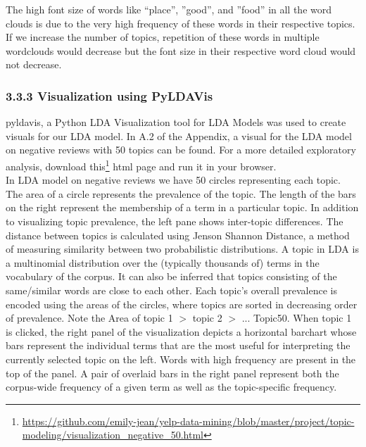 \documentclass{neu_handout}
\begin{document}
The high font size of words like “place”, ”good”, and ”food” in all the word clouds is due to the very high frequency of these words in their respective topics. If we increase the number of topics, repetition of these words in multiple wordclouds would decrease but the font size in their respective word cloud would not decrease. 

\subsubsection*{3.3.3 Visualization using PyLDAVis}
pyldavis, a Python LDA Visualization tool for LDA Models was used to create visuals for our LDA model. In A.2 of the Appendix, a visual for the LDA model on negative reviews with 50 topics can be found. For a more detailed exploratory analysis, download this\footnote{\url{https://github.com/emily-jean/yelp-data-mining/blob/master/project/topic-modeling/visualization_negative_50.html}} html page and run it in your browser.\\

In LDA model on negative reviews we have 50 circles representing each topic. The area of a circle represents the prevalence of the topic. The length of the bars on the right represent the membership of a term in a particular topic. In addition to visualizing topic prevalence, the left pane shows inter-topic differences. The distance between topics is calculated using Jenson Shannon Distance, a method of measuring similarity between two probabilistic distributions. A topic in LDA is a multinomial distribution over the (typically thousands of) terms in the vocabulary of the corpus. It can also be inferred that topics consisting of the same/similar words are close to each other. Each topic’s overall prevalence is encoded using the areas of the circles, where topics are sorted in decreasing order of prevalence. Note the Area of topic 1 $>$ topic 2 $>$ ... Topic50. When topic 1 is clicked, the right panel of the visualization depicts a horizontal barchart whose bars represent the individual terms that are the most useful for interpreting the currently selected topic on the left. Words with high frequency are present in the top of the panel. A pair of overlaid bars in the right panel represent both the corpus-wide frequency of a given term as well as the topic-specific frequency.
\end{document}

